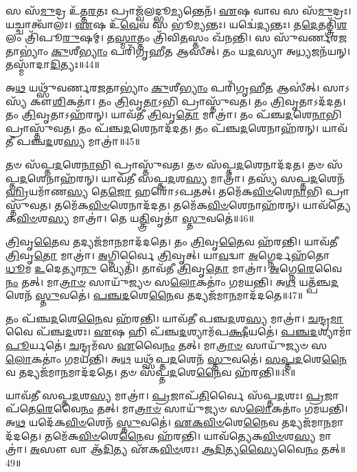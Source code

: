 𑌸 𑌸᳴\-\ul{𑌮𑍁}\-𑌦𑍍𑌰 𑌉᳴𑌤𑍍𑌤\-\ul{𑌰}\-𑌤𑌃 𑌪𑍍𑌰𑌾𑌜𑍍𑌵᳴𑌲𑌦𑍍𑌭𑍂\-\ul{𑌮𑍍𑌯}\-𑌨𑍍𑌤𑍇𑌨᳴।
\-\ul{𑌏}\-𑌷 𑌵𑌾𑌵 𑌸 𑌸᳴\-\ul{𑌮𑍁}\-𑌦𑍍𑌰𑌃।
𑌯𑌚𑍍𑌚𑌾𑌤𑍍𑌵𑌾᳴𑌲𑌃।
\-\ul{𑌏}\-𑌷 𑌉᳴\-\ul{𑌵𑍇}\-𑌵 𑌸 𑌭𑍂॑\-\ul{𑌮𑍍𑌯}\-𑌨𑍍𑌤𑌃।
𑌯𑌦𑍍𑌵𑍇॑\-\ul{𑌦𑍍𑌯}\-𑌨𑍍𑌤𑌃।
𑌤\-\ul{𑌦𑍇}\-𑌤𑌤𑍍𑌤𑍍𑌰𑌿᳴\-\ul{𑌶}\-𑌲𑌂 𑌤𑍍𑌰𑌿᳴𑌪𑍂\-\ul{𑌰𑍁}\-𑌷𑌮𑍍।
𑌤\-\ul{𑌸𑍍𑌮𑌾}\-𑌤𑍍𑌤𑌂 𑌤𑍍𑌰𑌿᳴𑌵𑌿\-\ul{𑌤}\-𑌸𑍍𑌤𑌂 𑌖᳴𑌨𑌨𑍍𑌤𑌿।
𑌸 𑌸𑍁᳴𑌵𑌰𑍍𑌣𑌰\-\ul{𑌜}\-𑌤𑌾𑌭𑍍𑌯𑌾𑌂॑ \ul{𑌕𑍁}\-𑌶𑍀\-\ul{𑌭𑍍𑌯𑌾𑌂} 𑌪𑌰𑌿᳴𑌗𑍃𑌹𑍀𑌤 𑌆𑌸𑍀𑌤𑍍।
𑌤𑌂 𑌯\-\ul{𑌦}\-𑌸𑍍𑌯𑌾 𑌅\-\ul{𑌧𑍍𑌯}\-𑌜𑌨᳴𑌯𑌨𑍍।
𑌤𑌸𑍍𑌮𑌾᳴𑌦𑌾\-\ul{𑌦𑌿}\-𑌤𑍍𑌯𑌃॥44॥

𑌅\-\ul{𑌥} 𑌯𑌥𑍍𑌸𑍁᳴𑌵𑌰𑍍𑌣𑌰\-\ul{𑌜}\-𑌤𑌾𑌭𑍍𑌯𑌾𑌂॑ \ul{𑌕𑍁}\-𑌶𑍀\-\ul{𑌭𑍍𑌯𑌾𑌂} 𑌪𑌰𑌿᳴𑌗𑍃𑌹𑍀\-\ul{𑌤} 𑌆𑌸𑍀॑𑌤𑍍।
𑌸𑌾𑌽𑌸𑍍𑌯᳴ 𑌕𑍗\-\ul{𑌶𑌿}\-𑌕𑌤𑌾॑।
𑌤𑌂 \ul{𑌤𑍍𑌰𑌿}\-𑌵𑍃\-\ul{𑌤𑌾}\-𑌽𑌭𑌿 𑌪𑍍𑌰𑌾𑌸𑍍𑌤𑍁᳴𑌵𑌤।
𑌤𑌂 \ul{𑌤𑍍𑌰𑌿}\-𑌵𑍃𑌤𑌾\-𑌽𑌦᳴𑌦𑌤।
𑌤𑌂 \ul{𑌤𑍍𑌰𑌿}\-𑌵𑍃𑌤𑌾\-𑌽𑌹᳴𑌰𑌨𑍍।
𑌯𑌾𑌵᳴𑌤𑍀 \ul{𑌤𑍍𑌰𑌿}\-𑌵𑍃\-\ul{𑌤𑍋} 𑌮𑌾𑌤𑍍𑌰𑌾॑।
𑌤𑌂 𑌪᳴𑌞𑍍𑌚\-\ul{𑌦}\-𑌶𑍇\-\ul{𑌨𑌾}\-𑌭𑌿 𑌪𑍍𑌰𑌾𑌸𑍍𑌤𑍁᳴𑌵𑌤।
𑌤𑌂 𑌪᳴𑌞𑍍𑌚\-\ul{𑌦}\-𑌶𑍇𑌨𑌾𑌦᳴𑌦𑌤।
𑌤𑌂 𑌪᳴𑌞𑍍𑌚\-\ul{𑌦}\-𑌶𑍇𑌨𑌾𑌹᳴𑌰𑌨𑍍।
𑌯𑌾𑌵᳴𑌤𑍀 𑌪𑌞𑍍𑌚\-\ul{𑌦}\-𑌶\-\ul{𑌸𑍍𑌯} 𑌮𑌾𑌤𑍍𑌰𑌾॑॥45॥

𑌤𑍞 𑌸᳴𑌪𑍍𑌤\-\ul{𑌦}\-𑌶𑍇\-\ul{𑌨𑌾}\-𑌭𑌿 𑌪𑍍𑌰𑌾𑌸𑍍𑌤𑍁᳴𑌵𑌤।
𑌤𑍞 𑌸᳴𑌪𑍍𑌤\-\ul{𑌦}\-𑌶𑍇𑌨𑌾𑌦᳴𑌦𑌤।
𑌤𑍞 𑌸᳴𑌪𑍍𑌤\-\ul{𑌦}\-𑌶𑍇𑌨𑌾𑌹᳴𑌰𑌨𑍍।
𑌯𑌾𑌵᳴𑌤𑍀 𑌸𑌪𑍍𑌤\-\ul{𑌦}\-𑌶\-\ul{𑌸𑍍𑌯} 𑌮𑌾𑌤𑍍𑌰𑌾॑।
𑌤𑌸𑍍𑌯᳴ 𑌸𑌪𑍍𑌤\-\ul{𑌦}\-𑌶𑍇𑌨᳴ \ul{𑌹𑍍𑌰𑌿}\-𑌯𑌮𑌾᳴𑌣\-\ul{𑌸𑍍𑌯} 𑌤𑍇\-\ul{𑌜𑍋} 𑌹𑌰𑍋᳴\-𑌽𑌪𑌤𑌤𑍍।
𑌤𑌮𑍇᳴𑌕\-\ul{𑌵𑌿}\-\-\ul{𑍞}\-𑌶𑍇\-\ul{𑌨𑌾}\-𑌭𑌿 𑌪𑍍𑌰𑌾𑌸𑍍𑌤𑍁᳴𑌵𑌤।
𑌤𑌮𑍇᳴𑌕\-\ul{𑌵𑌿}\-\-\ul{𑍞}\-𑌶𑍇𑌨𑌾𑌦᳴𑌦𑌤।
𑌤𑌮𑍇᳴𑌕\-\ul{𑌵𑌿}\-\-\ul{𑍞}\-𑌶𑍇𑌨𑌾𑌹᳴𑌰𑌨𑍍।
𑌯𑌾𑌵᳴𑌤𑍍𑌯𑍇𑌕\-\ul{𑌵𑌿}\-\-\ul{𑍞}\-𑌶\-\ul{𑌸𑍍𑌯} 𑌮𑌾𑌤𑍍𑌰𑌾॑।
𑌤𑍇 𑌯\-\ul{𑌤𑍍𑌤𑍍𑌰𑌿}\-𑌵𑍃𑌤𑌾॑ \ul{𑌸𑍍𑌤𑍁}\-𑌵𑌤𑍇॑॥46॥

\-\ul{𑌤𑍍𑌰𑌿}\-𑌵𑍃\-\ul{𑌤𑍈}\-𑌵 𑌤𑌦𑍍𑌯𑌜᳴𑌮𑌾\-\ul{𑌨}\-𑌮𑌾𑌦᳴𑌦𑌤𑍇।
𑌤𑌂 \ul{𑌤𑍍𑌰𑌿}\-𑌵𑍃\-\ul{𑌤𑍈}\-𑌵 𑌹᳴𑌰𑌨𑍍𑌤𑌿।
𑌯𑌾𑌵᳴𑌤𑍀 \ul{𑌤𑍍𑌰𑌿}\-𑌵𑍃\-\ul{𑌤𑍋} 𑌮𑌾𑌤𑍍𑌰𑌾॑।
\-\ul{𑌅}\-𑌗𑍍𑌨𑌿𑌰𑍍𑌵𑍈 \ul{𑌤𑍍𑌰𑌿}\-𑌵𑍃𑌤𑍍।
𑌯𑌾\-\ul{𑌵}\-𑌦𑍍𑌵𑌾 \ul{𑌅}\-𑌗𑍍𑌨𑍇𑌰𑍍𑌦𑌹᳴𑌤𑍋 \ul{𑌧𑍂}\-𑌮 \ul{𑌉}\-𑌦𑍇𑌤𑍍𑌯𑌾\-\ul{𑌨𑍁} 𑌵𑍍𑌯𑍇𑌤𑌿᳴।
𑌤𑌾𑌵᳴𑌤𑍀 \ul{𑌤𑍍𑌰𑌿}\-𑌵𑍃\-\ul{𑌤𑍋} 𑌮𑌾𑌤𑍍𑌰𑌾॑।
\-\ul{𑌅}\-𑌗𑍍𑌨𑍇\-\ul{𑌰𑍇}\-𑌵𑍈\-\ul{𑌨𑌂} 𑌤𑌤𑍍।
𑌮𑌾\-\ul{𑌤𑍍𑌰𑌾}\-\-\ul{𑍞} 𑌸𑌾𑌯𑍁᳴𑌜𑍍𑌯𑍞 𑌸\-\ul{𑌲𑍋}\-𑌕𑌤𑌾𑌂॑ 𑌗𑌮𑌯𑌨𑍍𑌤𑌿।
𑌅\-\ul{𑌥} 𑌯𑌤𑍍𑌪᳴𑌞𑍍𑌚\-\ul{𑌦}\-𑌶𑍇𑌨᳴ \ul{𑌸𑍍𑌤𑍁}\-𑌵𑌤𑍇॑।
\-\ul{𑌪}\-\-\ul{𑌞𑍍𑌚}\-\-\ul{𑌦}\-𑌶𑍇\-\ul{𑌨𑍈}\-𑌵 𑌤𑌦𑍍𑌯𑌜᳴𑌮𑌾\-\ul{𑌨}\-𑌮𑌾𑌦᳴𑌦𑌤𑍇॥47॥

𑌤𑌂 𑌪᳴𑌞𑍍𑌚\-\ul{𑌦}\-𑌶𑍇\-\ul{𑌨𑍈}\-𑌵 𑌹᳴𑌰𑌨𑍍𑌤𑌿।
𑌯𑌾𑌵᳴𑌤𑍀 𑌪𑌞𑍍𑌚\-\ul{𑌦}\-𑌶\-\ul{𑌸𑍍𑌯} 𑌮𑌾𑌤𑍍𑌰𑌾॑।
\-\ul{𑌚}\-𑌨𑍍𑌦𑍍𑌰\-\ul{𑌮𑌾} 𑌵𑍈 𑌪᳴𑌞𑍍𑌚\-\ul{𑌦}\-𑌶𑌃।
\-\ul{𑌏}\-𑌷 𑌹𑌿 𑌪᳴𑌞𑍍𑌚\-\ul{𑌦}\-𑌶𑍍𑌯𑌾𑌮᳴𑌪\-\ul{𑌕𑍍𑌷𑍀}\-𑌯𑌤𑍇॑।
\-\ul{𑌪}\-\-\ul{𑌞𑍍𑌚}\-\-\ul{𑌦}\-𑌶𑍍𑌯𑌾𑌮𑌾᳴\-\ul{𑌪𑍂}\-𑌰𑍍𑌯𑌤𑍇॑।
\-\ul{𑌚}\-𑌨𑍍𑌦𑍍𑌰𑌮᳴𑌸 \ul{𑌏}\-𑌵𑍈\-\ul{𑌨𑌂} 𑌤𑌤𑍍।
𑌮𑌾\-\ul{𑌤𑍍𑌰𑌾}\-\-\ul{𑍞} 𑌸𑌾𑌯𑍁᳴𑌜𑍍𑌯𑍞 𑌸\-\ul{𑌲𑍋}\-𑌕𑌤𑌾𑌂॑ 𑌗𑌮𑌯𑌨𑍍𑌤𑌿।
𑌅\-\ul{𑌥} 𑌯𑌥𑍍𑌸᳴𑌪𑍍𑌤\-\ul{𑌦}\-𑌶𑍇𑌨᳴ \ul{𑌸𑍍𑌤𑍁}\-𑌵𑌤𑍇॑।
\-\ul{𑌸}\-\-\ul{𑌪𑍍𑌤}\-\-\ul{𑌦}\-𑌶𑍇\-\ul{𑌨𑍈}\-𑌵 𑌤𑌦𑍍𑌯𑌜᳴𑌮𑌾\-\ul{𑌨}\-𑌮𑌾𑌦᳴𑌦𑌤𑍇।
𑌤𑍞 𑌸᳴𑌪𑍍𑌤\-\ul{𑌦}\-𑌶𑍇\-\ul{𑌨𑍈}\-𑌵 𑌹᳴𑌰𑌨𑍍𑌤𑌿॥48॥

𑌯𑌾𑌵᳴𑌤𑍀 𑌸𑌪𑍍𑌤\-\ul{𑌦}\-𑌶\-\ul{𑌸𑍍𑌯} 𑌮𑌾𑌤𑍍𑌰𑌾॑।
\-\ul{𑌪𑍍𑌰}\-𑌜𑌾𑌪᳴\-\ul{𑌤𑌿}\-𑌰𑍍𑌵𑍈 𑌸᳴𑌪𑍍𑌤\-\ul{𑌦}\-𑌶𑌃।
\-\ul{𑌪𑍍𑌰}\-𑌜𑌾𑌪᳴𑌤𑍇\-\ul{𑌰𑍇}\-𑌵𑍈\-\ul{𑌨𑌂} 𑌤𑌤𑍍।
𑌮𑌾\-\ul{𑌤𑍍𑌰𑌾}\-\-\ul{𑍞} 𑌸𑌾𑌯𑍁᳴𑌜𑍍𑌯𑍞 𑌸\-\ul{𑌲𑍋}\-𑌕𑌤𑌾𑌂॑ 𑌗𑌮𑌯𑌨𑍍𑌤𑌿।
𑌅\-\ul{𑌥} 𑌯𑌦𑍇᳴𑌕\-\ul{𑌵𑌿}\-\-\ul{𑍞}\-𑌶𑍇𑌨᳴ \ul{𑌸𑍍𑌤𑍁}\-𑌵𑌤𑍇॑।
\-\ul{𑌏}\-\-\ul{𑌕}\-\-\ul{𑌵𑌿}\-\-\ul{𑍞}\-𑌶𑍇\-\ul{𑌨𑍈}\-𑌵 𑌤𑌦𑍍𑌯𑌜᳴𑌮𑌾\-\ul{𑌨}\-𑌮𑌾𑌦᳴𑌦𑌤𑍇।
𑌤𑌮𑍇᳴𑌕\-\ul{𑌵𑌿}\-\-\ul{𑍞}\-𑌶𑍇\-\ul{𑌨𑍈}\-𑌵 𑌹᳴𑌰𑌨𑍍𑌤𑌿।
𑌯𑌾𑌵᳴𑌤𑍍𑌯𑍇𑌕\-\-\ul{𑌵𑌿}\-\-\ul{𑍞}\-𑌶\-\ul{𑌸𑍍𑌯} 𑌮𑌾𑌤𑍍𑌰𑌾॑।
\-\ul{𑌅}\-𑌸𑍗 𑌵𑌾 𑌆᳴\-\ul{𑌦𑌿}\-𑌤𑍍𑌯 𑌏᳴𑌕\-\ul{𑌵𑌿}\-\-\ul{𑍞}\-𑌶𑌃।
\-\ul{𑌆}\-\-\ul{𑌦𑌿}\-𑌤𑍍𑌯\-\ul{𑌸𑍍𑌯𑍈}\-𑌵𑍈\-\ul{𑌨𑌂} 𑌤𑌤𑍍॥49॥

